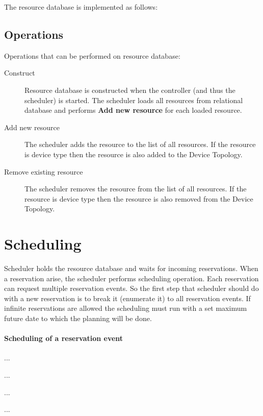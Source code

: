 The resource database is implemented as follows:


\subsection{Operations}

Operations that can be performed on resource database:

\begin{description}
\item[Construct]
Resource database is constructed when the controller (and thus the scheduler) 
is started. The scheduler loads all resources from relational database and 
performs \textbf{Add new resource} for each loaded resource.

\item[Add new resource]
The scheduler adds the resource to the list of all resources. If the resource 
is device type then the resource is also added to the Device Topology.

\item[Remove existing resource]
The scheduler removes the resource from the list of all resources. If the 
resource is device type then the resource is also removed from the Device 
Topology.
\end{description}

\section{Scheduling}

Scheduler holds the resource database and waits for incoming reservations. When a reservation arise, the scheduler performs scheduling operation. Each reservation can request multiple reservation events. So the first step that
scheduler should do with a new reservation is to break it (enumerate it) to
all reservation events. If infinite reservations are allowed the scheduling must run with a set maximum future date to which the planning will be done.

\paragraph{Scheduling of a reservation event}
{
\renewcommand{\labelenumi}{\arabic{enumi}.}
\renewcommand{\labelenumii}{\arabic{enumi}.\arabic{enumii}}
\begin{compactenum}
\item ...
  \begin{compactenum}
  \item ...
  \item ...
  \end{compactenum}
\item ...
\end{compactenum}
}

